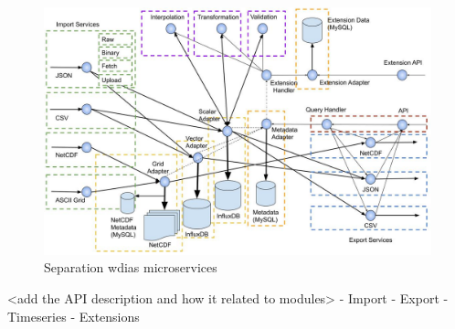 \begin{figure}[htp]
    \centering
    \includegraphics[width=1\textwidth]{method/microservice/separation_microservices-v3.jpg}
    \caption{Separation \acrshort{wdias} microservices}
    \label{fi:wdias_micro_separation}
\end{figure}

<add the API description and how it related to modules>
- Import
- Export
- Timeseries
- Extensions
